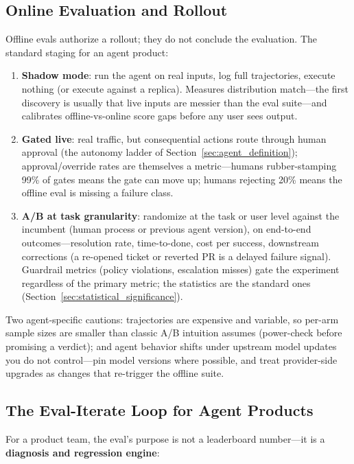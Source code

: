 \subsection{Online Evaluation and Rollout}

Offline evals authorize a rollout; they do not conclude the evaluation. The standard staging for an agent product:

\begin{enumerate}
    \item \textbf{Shadow mode}: run the agent on real inputs, log full trajectories, execute nothing (or execute against a replica). Measures distribution match---the first discovery is usually that live inputs are messier than the eval suite---and calibrates offline-vs-online score gaps before any user sees output.
    \item \textbf{Gated live}: real traffic, but consequential actions route through human approval (the autonomy ladder of Section~\ref{sec:agent_definition}); approval/override rates are themselves a metric---humans rubber-stamping 99\% of gates means the gate can move up; humans rejecting 20\% means the offline eval is missing a failure class.
    \item \textbf{A/B at task granularity}: randomize at the task or user level against the incumbent (human process or previous agent version), on end-to-end outcomes---resolution rate, time-to-done, cost per success, downstream corrections (a re-opened ticket or reverted PR is a delayed failure signal). Guardrail metrics (policy violations, escalation misses) gate the experiment regardless of the primary metric; the statistics are the standard ones (Section~\ref{sec:statistical_significance}).
\end{enumerate}

Two agent-specific cautions: trajectories are expensive and variable, so per-arm sample sizes are smaller than classic A/B intuition assumes (power-check before promising a verdict); and agent behavior shifts under upstream model updates you do not control---pin model versions where possible, and treat provider-side upgrades as changes that re-trigger the offline suite.

\subsection{The Eval-Iterate Loop for Agent Products}

For a product team, the eval's purpose is not a leaderboard number---it is a \textbf{diagnosis and regression engine}:

